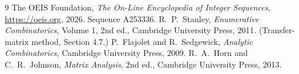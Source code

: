 \documentclass[11pt,a4paper]{article}
\theoremstyle{plain}
\theoremstyle{definition}
\begin{document}
\begin{thebibliography}{9}
 The OEIS Foundation, \emph{The On-Line Encyclopedia of Integer
Sequences}, \url{https://oeis.org}, 2026. Sequence A253336.
 R.~P.~Stanley, \emph{Enumerative Combinatorics}, Volume 1, 2nd ed.,
Cambridge University Press, 2011. (Transfer-matrix method, Section 4.7.)
 P.~Flajolet and R.~Sedgewick, \emph{Analytic Combinatorics}, Cambridge
University Press, 2009.
 R.~A.~Horn and C.~R.~Johnson, \emph{Matrix Analysis}, 2nd ed., Cambridge
University Press, 2013.
\end{thebibliography}
\end{document}
